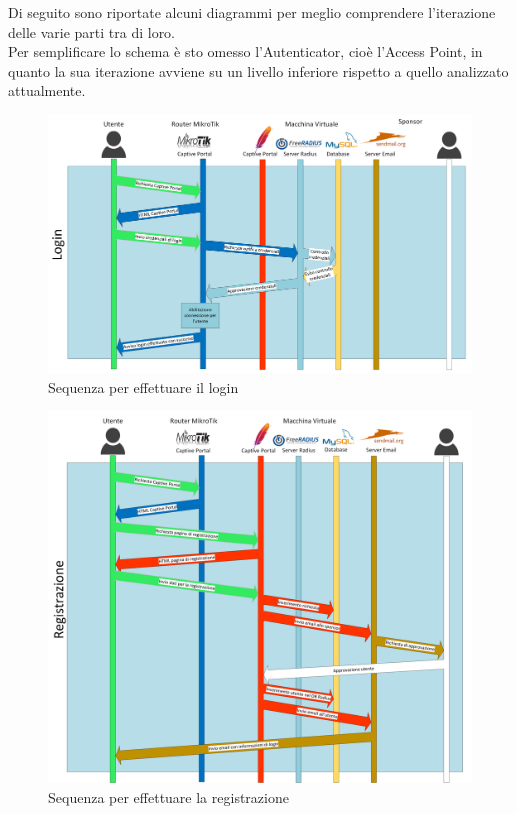 \documentclass[Realizzazione.tex]{subfiles}
\begin{document}
Di seguito sono riportate alcuni diagrammi per meglio comprendere l'iterazione delle varie parti tra di loro. \\
Per semplificare lo schema è sto omesso l'Autenticator, cioè l'Access Point, in quanto la sua iterazione avviene su un livello inferiore rispetto a quello analizzato attualmente.

\begin{figure}[H]
	\centering
	\includegraphics[width=1.1\linewidth]{"images/CaptivePortal1"}
	\caption{Sequenza per effettuare il login}
	\label{fig:Sequenza per effettuare il login}
\end{figure}
\begin{figure}[H]
	\centering
	\includegraphics[width=1.1\linewidth]{"images/CaptivePortal2"}
	\caption{Sequenza per effettuare la registrazione}
	\label{fig:Sequenza per effettuare la registrazione}
\end{figure}
\end{document}
